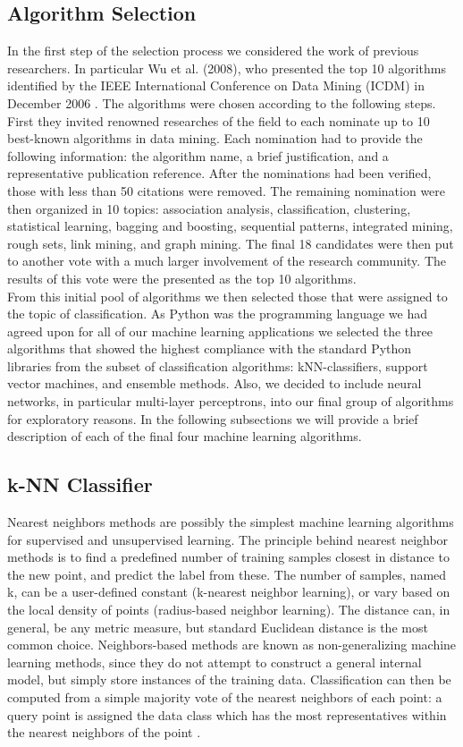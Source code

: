 \subsection{Algorithm Selection}\label{mlsel}
In the first step of the selection process we considered the work of previous researchers. In particular Wu et al. (2008), who presented the top 10 algorithms identified by the IEEE International Conference on Data Mining (ICDM) in December 2006 \cite{Wu2008}. The algorithms were chosen according to the following steps. First they invited renowned researches of the field to each nominate up to 10 best-known algorithms in data mining. Each nomination had to provide the following information: the algorithm name, a brief justification, and a representative publication reference. After the nominations had been verified, those with less than 50 citations were removed. The remaining nomination were then organized in 10 topics: association analysis, classification, clustering, statistical learning, bagging and boosting, sequential patterns, integrated mining, rough sets, link mining, and graph mining. The final 18 candidates were then put to another vote with a much larger involvement of the research community. The results of this vote were the presented as the top 10 algorithms.\\
From this initial pool of algorithms we then selected those that were assigned to the topic of classification. As Python was the programming language we had agreed upon for all of our machine learning applications we selected the three algorithms that showed the highest compliance with the standard Python libraries from the subset of classification algorithms: kNN-classifiers, support vector machines, and ensemble methods. Also, we decided to include neural networks, in particular multi-layer perceptrons, into our final group of algorithms for exploratory reasons. 
In the following subsections we will provide a brief description of each of the final four machine learning algorithms.

\subsection{k-NN Classifier} 
Nearest neighbors methods are possibly the simplest machine learning algorithms for supervised and unsupervised learning. The principle behind nearest neighbor methods is to find a predefined number of training samples closest in distance to the new point, and predict the label from these. The number of samples, named k, can be a user-defined constant (k-nearest neighbor learning), or vary based on the local density of points (radius-based neighbor learning). The distance can, in general, be any metric measure, but standard Euclidean distance is the most common choice. Neighbors-based methods are known as non-generalizing machine learning methods, since they do not attempt to construct a general internal model, but simply store instances of the training data. Classification can then be computed from a simple majority vote of the nearest neighbors of each point: a query point is assigned the data class which has the most representatives within the nearest neighbors of the point \cite{Pedregosa2011}. 

